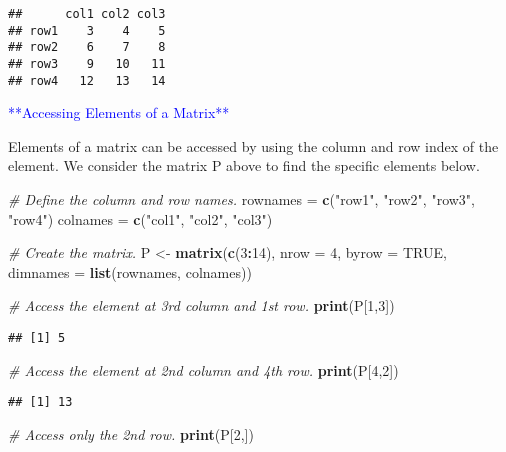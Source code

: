 \documentclass[
]{article}
\newenvironment{Shaded}{\begin{snugshade}}{\end{snugshade}}
\newcommand{\AttributeTok}[1]{\textcolor[rgb]{0.13,0.29,0.53}{#1}}
\newcommand{\CommentTok}[1]{\textcolor[rgb]{0.56,0.35,0.01}{\textit{#1}}}
\newcommand{\ConstantTok}[1]{\textcolor[rgb]{0.56,0.35,0.01}{#1}}
\newcommand{\DecValTok}[1]{\textcolor[rgb]{0.00,0.00,0.81}{#1}}
\newcommand{\FunctionTok}[1]{\textcolor[rgb]{0.13,0.29,0.53}{\textbf{#1}}}
\newcommand{\NormalTok}[1]{#1}
\newcommand{\OtherTok}[1]{\textcolor[rgb]{0.56,0.35,0.01}{#1}}
\newcommand{\SpecialCharTok}[1]{\textcolor[rgb]{0.81,0.36,0.00}{\textbf{#1}}}
\newcommand{\StringTok}[1]{\textcolor[rgb]{0.31,0.60,0.02}{#1}}
\begin{document}
\begin{verbatim}
##      col1 col2 col3
## row1    3    4    5
## row2    6    7    8
## row3    9   10   11
## row4   12   13   14
\end{verbatim}

\textcolor{blue}{**Accessing Elements of a Matrix**}

Elements of a matrix can be accessed by using the column and row index
of the element. We consider the matrix P above to find the specific
elements below.

\begin{Shaded}
\begin{Highlighting}[]
\CommentTok{\# Define the column and row names.}
\NormalTok{rownames }\OtherTok{=} \FunctionTok{c}\NormalTok{(}\StringTok{"row1"}\NormalTok{, }\StringTok{"row2"}\NormalTok{, }\StringTok{"row3"}\NormalTok{, }\StringTok{"row4"}\NormalTok{)}
\NormalTok{colnames }\OtherTok{=} \FunctionTok{c}\NormalTok{(}\StringTok{"col1"}\NormalTok{, }\StringTok{"col2"}\NormalTok{, }\StringTok{"col3"}\NormalTok{)}

\CommentTok{\# Create the matrix.}
\NormalTok{P }\OtherTok{\textless{}{-}} \FunctionTok{matrix}\NormalTok{(}\FunctionTok{c}\NormalTok{(}\DecValTok{3}\SpecialCharTok{:}\DecValTok{14}\NormalTok{), }\AttributeTok{nrow =} \DecValTok{4}\NormalTok{, }\AttributeTok{byrow =} \ConstantTok{TRUE}\NormalTok{, }\AttributeTok{dimnames =} \FunctionTok{list}\NormalTok{(rownames, colnames))}

\CommentTok{\# Access the element at 3rd column and 1st row.}
\FunctionTok{print}\NormalTok{(P[}\DecValTok{1}\NormalTok{,}\DecValTok{3}\NormalTok{])}
\end{Highlighting}
\end{Shaded}

\begin{verbatim}
## [1] 5
\end{verbatim}

\begin{Shaded}
\begin{Highlighting}[]
\CommentTok{\# Access the element at 2nd column and 4th row.}
\FunctionTok{print}\NormalTok{(P[}\DecValTok{4}\NormalTok{,}\DecValTok{2}\NormalTok{])}
\end{Highlighting}
\end{Shaded}

\begin{verbatim}
## [1] 13
\end{verbatim}

\begin{Shaded}
\begin{Highlighting}[]
\CommentTok{\# Access only the  2nd row.}
\FunctionTok{print}\NormalTok{(P[}\DecValTok{2}\NormalTok{,])}
\end{Highlighting}
\end{Shaded}
\end{document}
